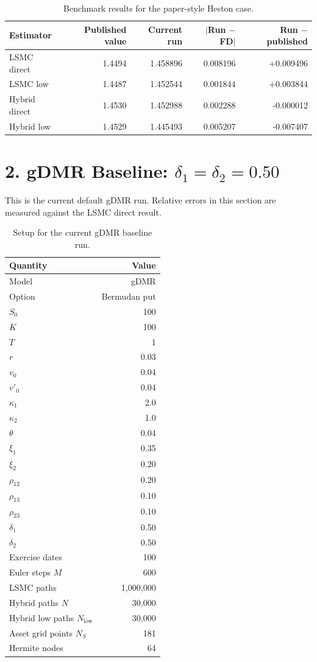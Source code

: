 \documentclass[11pt]{article}
\begin{document}
\begin{table}[htbp]
\centering
\caption{Benchmark results for the paper-style Heston case.}
\begin{tabular}{lrrrr}
\toprule
Estimator & Published value & Current run & $|$Run $-$ FD$|$ & Run $-$ published \\
\midrule
LSMC direct   & 1.4494 & 1.458896 & 0.008196 & +0.009496 \\
LSMC low      & 1.4487 & 1.452544 & 0.001844 & +0.003844 \\
Hybrid direct & 1.4530 & 1.452988 & 0.002288 & -0.000012 \\
Hybrid low    & 1.4529 & 1.445493 & 0.005207 & -0.007407 \\
\bottomrule
\end{tabular}
\end{table}

\section*{2. gDMR Baseline: $\delta_1=\delta_2=0.50$}

This is the current default gDMR run.
Relative errors in this section are measured against the LSMC direct result.

\begin{table}[htbp]
\centering
\caption{Setup for the current gDMR baseline run.}
\begin{tabular}{lr}
\toprule
Quantity & Value \\
\midrule
Model & gDMR \\
Option & Bermudan put \\
$S_0$ & 100 \\
$K$ & 100 \\
$T$ & 1 \\
$r$ & 0.03 \\
$v_0$ & 0.04 \\
$v'_0$ & 0.04 \\
$\kappa_1$ & 2.0 \\
$\kappa_2$ & 1.0 \\
$\theta$ & 0.04 \\
$\xi_1$ & 0.35 \\
$\xi_2$ & 0.20 \\
$\rho_{12}$ & 0.20 \\
$\rho_{13}$ & 0.10 \\
$\rho_{23}$ & 0.10 \\
$\delta_1$ & 0.50 \\
$\delta_2$ & 0.50 \\
Exercise dates & 100 \\
Euler steps $M$ & 600 \\
LSMC paths & 1,000,000 \\
Hybrid paths $N$ & 30,000 \\
Hybrid low paths $N_{\mathrm{low}}$ & 30,000 \\
Asset grid points $N_S$ & 181 \\
Hermite nodes & 64 \\
\bottomrule
\end{tabular}
\end{table}
\end{document}
